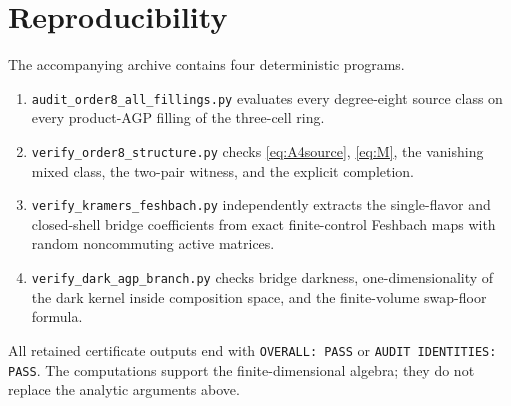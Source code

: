 \documentclass[11pt]{article}
\theoremstyle{definition}
\theoremstyle{remark}
\begin{document}
\section*{Reproducibility}

The accompanying archive contains four deterministic programs.
\begin{enumerate}
\item \texttt{audit\_order8\_all\_fillings.py} evaluates every degree-eight source class on every product-AGP filling of the three-cell ring.
\item \texttt{verify\_order8\_structure.py} checks \eqref{eq:A4source}, \eqref{eq:M}, the vanishing mixed class, the two-pair witness, and the explicit completion.
\item \texttt{verify\_kramers\_feshbach.py} independently extracts the single-flavor and closed-shell bridge coefficients from exact finite-control Feshbach maps with random noncommuting active matrices.
\item \texttt{verify\_dark\_agp\_branch.py} checks bridge darkness, one-dimensionality of the dark kernel inside composition space, and the finite-volume swap-floor formula.
\end{enumerate}
All retained certificate outputs end with \texttt{OVERALL: PASS} or \texttt{AUDIT IDENTITIES: PASS}.  The computations support the finite-dimensional algebra; they do not replace the analytic arguments above.
\end{document}
